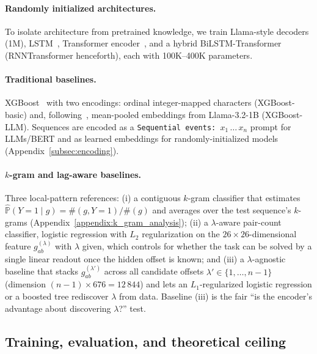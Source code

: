 \documentclass{article} %
\theoremstyle{plain}
\theoremstyle{definition}
\theoremstyle{remark}
\begin{document}
\paragraph{Randomly initialized architectures.} To isolate architecture from pretrained knowledge, we train Llama-style decoders (1M), LSTM~\citep{hochreiter1997lstm}, Transformer encoder~\citep{vaswani2017attention}, and a hybrid BiLSTM-Transformer~\citep{graves2005bilstm} (RNNTransformer henceforth), each with 100K--400K parameters.

\paragraph{Traditional baselines.} XGBoost~\citep{chen2016xgboost} with two encodings: ordinal integer-mapped characters (XGBoost-basic) and, following~\citet{XGBoost_LLMs, XGBoost_LLMs_HF}, mean-pooled embeddings from Llama-3.2-1B (XGBoost-LLM). Sequences are encoded as a \texttt{Sequential events: $x_1\,\ldots\,x_n$} prompt for LLMs/BERT and as learned embeddings for randomly-initialized models (Appendix~\ref{subsec:encoding}).

\paragraph{$k$-gram and lag-aware baselines.} Three local-pattern references: (i) a contiguous $k$-gram classifier that estimates $\hat{\mathbb{P}}(Y=1\mid g) = \#(g, Y=1)/\#(g)$ and averages over the test sequence's $k$-grams (Appendix~\ref{appendix:k_gram_analysis}); (ii) a $\lambda$-aware pair-count classifier, logistic regression with $L_2$ regularization on the $26\!\times\!26$-dimensional feature $g_{ab}^{(\lambda)}$ with $\lambda$ given, which controls for whether the task can be solved by a single linear readout once the hidden offset is known; and (iii) a $\lambda$-agnostic baseline that stacks $g_{ab}^{(\lambda')}$ across all candidate offsets $\lambda' \in \{1, \ldots, n{-}1\}$ (dimension $(n{-}1)\!\times\! 676 = 12\,844$) and lets an $L_1$-regularized logistic regression or a boosted tree rediscover $\lambda$ from data. Baseline (iii) is the fair ``is the encoder's advantage about discovering $\lambda$?'' test.

\subsection{Training, evaluation, and theoretical ceiling}
\label{subsec:training}
\label{subsec:evaluation}
\end{document}
